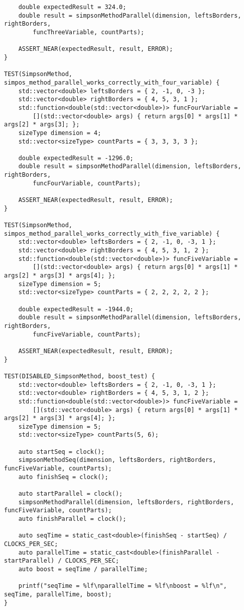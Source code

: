 \documentclass{report}
\begin{document}
\begin{lstlisting}
    double expectedResult = 324.0;
    double result = simpsonMethodParallel(dimension, leftsBorders, rightBorders,
        funcThreeVariable, countParts);

    ASSERT_NEAR(expectedResult, result, ERROR);
}

TEST(SimpsonMethod, simpos_method_parallel_works_correctly_with_four_variable) {
    std::vector<double> leftsBorders = { 2, -1, 0, -3 };
    std::vector<double> rightBorders = { 4, 5, 3, 1 };
    std::function<double(std::vector<double>)> funcFourVariable =
        [](std::vector<double> args) { return args[0] * args[1] * args[2] * args[3]; };
    sizeType dimension = 4;
    std::vector<sizeType> countParts = { 3, 3, 3, 3 };

    double expectedResult = -1296.0;
    double result = simpsonMethodParallel(dimension, leftsBorders, rightBorders,
        funcFourVariable, countParts);

    ASSERT_NEAR(expectedResult, result, ERROR);
}

TEST(SimpsonMethod, simpos_method_parallel_works_correctly_with_five_variable) {
    std::vector<double> leftsBorders = { 2, -1, 0, -3, 1 };
    std::vector<double> rightBorders = { 4, 5, 3, 1, 2 };
    std::function<double(std::vector<double>)> funcFiveVariable =
        [](std::vector<double> args) { return args[0] * args[1] * args[2] * args[3] * args[4]; };
    sizeType dimension = 5;
    std::vector<sizeType> countParts = { 2, 2, 2, 2, 2 };

    double expectedResult = -1944.0;
    double result = simpsonMethodParallel(dimension, leftsBorders, rightBorders,
        funcFiveVariable, countParts);

    ASSERT_NEAR(expectedResult, result, ERROR);
}

TEST(DISABLED_SimpsonMethod, boost_test) {
    std::vector<double> leftsBorders = { 2, -1, 0, -3, 1 };
    std::vector<double> rightBorders = { 4, 5, 3, 1, 2 };
    std::function<double(std::vector<double>)> funcFiveVariable =
        [](std::vector<double> args) { return args[0] * args[1] * args[2] * args[3] * args[4]; };
    sizeType dimension = 5;
    std::vector<sizeType> countParts(5, 6);

    auto startSeq = clock();
    simpsonMethodSeq(dimension, leftsBorders, rightBorders, funcFiveVariable, countParts);
    auto finishSeq = clock();

    auto startParallel = clock();
    simpsonMethodParallel(dimension, leftsBorders, rightBorders, funcFiveVariable, countParts);
    auto finishParallel = clock();

    auto seqTime = static_cast<double>(finishSeq - startSeq) / CLOCKS_PER_SEC;
    auto parallelTime = static_cast<double>(finishParallel - startParallel) / CLOCKS_PER_SEC;
    auto boost = seqTime / parallelTime;

    printf("seqTime = %lf\nparallelTime = %lf\nboost = %lf\n", seqTime, parallelTime, boost);
}

\end{lstlisting}
\end{document}
